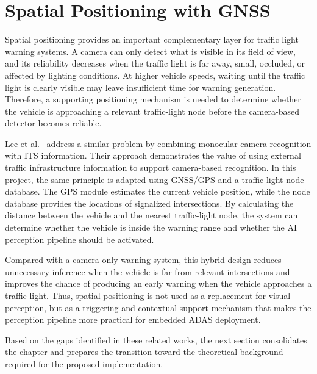 \section{Spatial Positioning with GNSS}

Spatial positioning provides an important complementary layer for traffic light warning systems. A camera can only detect what is visible in its field of view, and its reliability decreases when the traffic light is far away, small, occluded, or affected by lighting conditions. At higher vehicle speeds, waiting until the traffic light is clearly visible may leave insufficient time for warning generation. Therefore, a supporting positioning mechanism is needed to determine whether the vehicle is approaching a relevant traffic-light node before the camera-based detector becomes reliable.

Lee et al.~\cite{Lee2022TrafficLightRecognition} address a similar problem by combining monocular camera recognition with ITS information. Their approach demonstrates the value of using external traffic infrastructure information to support camera-based recognition. In this project, the same principle is adapted using GNSS/GPS and a traffic-light node database. The GPS module estimates the current vehicle position, while the node database provides the locations of signalized intersections. By calculating the distance between the vehicle and the nearest traffic-light node, the system can determine whether the vehicle is inside the warning range and whether the AI perception pipeline should be activated.

Compared with a camera-only warning system, this hybrid design reduces unnecessary inference when the vehicle is far from relevant intersections and improves the chance of producing an early warning when the vehicle approaches a traffic light. Thus, spatial positioning is not used as a replacement for visual perception, but as a triggering and contextual support mechanism that makes the perception pipeline more practical for embedded ADAS deployment.

Based on the gaps identified in these related works, the next section consolidates the chapter and prepares the transition toward the theoretical background required for the proposed implementation.

